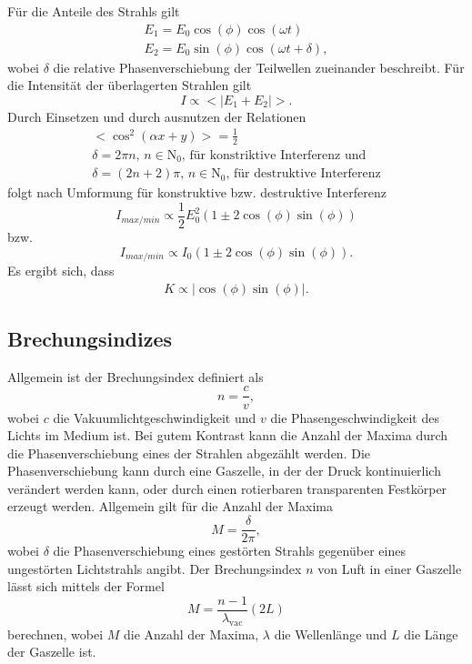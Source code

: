 Für die Anteile des Strahls gilt
\begin{gather*}
  E_1 = E_0\cos(\phi)\cos(\omega t) \\
  E_2 = E_0\sin(\phi)\cos(\omega t + \delta),
\end{gather*}
wobei $\delta$ die relative Phasenverschiebung der Teilwellen zueinander beschreibt.
Für die Intensität der überlagerten Strahlen gilt
\begin{equation*}
  I \propto <|E_1 + E_2|>.
\end{equation*}
Durch Einsetzen und durch ausnutzen der Relationen
\begin{gather*}
  <\cos^2(\alpha x + y)> = \frac{1}{2} \\
  \delta = 2\pi n , \, n\in\mathrm{N}_0,\, \text{für konstriktive Interferenz und} \\
  \delta = (2n+2)\pi,\, n\in\mathrm{N}_0,\, \text{für destruktive Interferenz}
\end{gather*}
folgt nach Umformung für konstruktive bzw. destruktive Interferenz
\begin{equation*}
  I_{max/min} \propto \frac{1}{2}E_0^2 (1 \pm 2\cos(\phi)\sin(\phi))
\end{equation*}
bzw.
\begin{equation}
  I_{max/min} \propto I_0(1 \pm 2\cos(\phi)\sin(\phi)).
\end{equation}
Es ergibt sich, dass
\begin{align*}
  K \propto |\cos(\phi)\sin(\phi)|.
\end{align*}

\subsection{Brechungsindizes}
Allgemein ist der Brechungsindex definiert als
\begin{equation*}
  n = \frac{c}{v},
\end{equation*}
wobei $c$ die Vakuumlichtgeschwindigkeit und $v$ die Phasengeschwindigkeit des Lichts im Medium ist.
Bei gutem Kontrast kann die Anzahl der Maxima durch die Phasenverschiebung eines
der Strahlen abgezählt werden. Die Phasenverschiebung kann durch eine Gaszelle,
in der der Druck kontinuierlich verändert werden kann, oder durch einen rotierbaren
transparenten Festkörper erzeugt werden.
Allgemein gilt für die Anzahl der Maxima
\begin{equation*}
  M = \frac{\delta}{2\pi},
\end{equation*}
wobei $\delta$ die Phasenverschiebung eines gestörten Strahls gegenüber eines
ungestörten Lichtstrahls angibt.
Der Brechungsindex $n$ von Luft in einer Gaszelle lässt sich mittels der Formel
\begin{equation}
  M = \frac{n-1}{\lambda_{\text{vac}}}(2L)
  \label{eqn:brechluft}
\end{equation}
berechnen,
wobei $M$ die Anzahl der Maxima, $\lambda$ die Wellenlänge und $L$ die Länge der Gaszelle ist.

